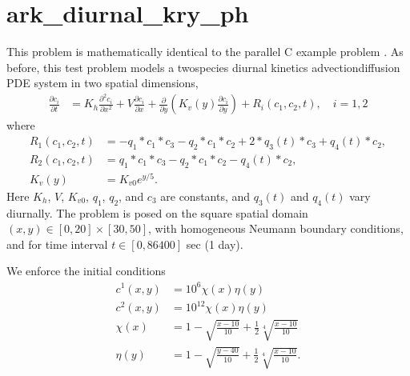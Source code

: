 \documentclass[letterpaper,10pt,english]{sphinxmanual}
\begin{document}
\section{ark\_diurnal\_kry\_ph}
\label{\detokenize{c_parhyp:ark-diurnal-kry-ph}}\label{\detokenize{c_parhyp:id1}}
\sphinxAtStartPar
This problem is mathematically identical to the parallel C example
problem {\hyperref[\detokenize{c_parallel:ark-diurnal-kry-p}]{}}.  As before, this test problem models
a two\sphinxhyphen{}species diurnal kinetics advection\sphinxhyphen{}diffusion PDE system in two
spatial dimensions,
\begin{equation*}
\begin{split}\frac{\partial c_i}{\partial t} &=
  K_h \frac{\partial^2 c_i}{\partial x^2} +
  V \frac{\partial     c_i}{\partial x} +
  \frac{\partial}{\partial y}\left( K_v(y)
  \frac{\partial c_i}{\partial y}\right) +
  R_i(c_1,c_2,t),\quad i=1,2\end{split}
\end{equation*}
\sphinxAtStartPar
where
\begin{equation*}
\begin{split}R_1(c_1,c_2,t) &= -q_1*c_1*c_3 - q_2*c_1*c_2 + 2*q_3(t)*c_3 + q_4(t)*c_2, \\
R_2(c_1,c_2,t) &=  q_1*c_1*c_3 - q_2*c_1*c_2 - q_4(t)*c_2, \\
K_v(y) &= K_{v0} e^{y/5}.\end{split}
\end{equation*}
\sphinxAtStartPar
Here \(K_h\), \(V\), \(K_{v0}\), \(q_1\), \(q_2\),
and \(c_3\) are constants, and \(q_3(t)\) and \(q_4(t)\)
vary diurnally.  The problem is posed on the square spatial domain
\((x,y) \in [0,20]\times[30,50]\), with homogeneous Neumann
boundary conditions, and for time interval \(t\in [0,86400]\) sec
(1 day).

\sphinxAtStartPar
We enforce the initial conditions
\begin{equation*}
\begin{split}c^1(x,y) &=  10^6 \chi(x)\eta(y) \\
c^2(x,y) &=  10^{12} \chi(x)\eta(y) \\
\chi(x) &= 1 - \sqrt{\frac{x - 10}{10}} + \frac12 \sqrt[4]{\frac{x - 10}{10}} \\
\eta(y) &= 1 - \sqrt{\frac{y - 40}{10}} + \frac12 \sqrt[4]{\frac{x - 10}{10}}.\end{split}
\end{equation*}
\end{document}
